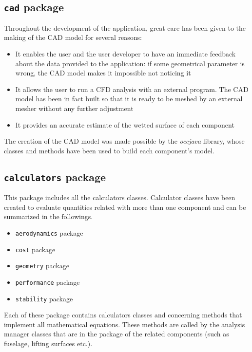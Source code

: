 \subsection{\texttt{cad} package}
Throughout the development of the application, great care has been given to the making of the CAD model for several reasons:
%
\begin{itemize}
	\item It enables the user and the user developer to have an immediate feedback about the data provided to the application: if some geometrical parameter is wrong, the CAD model makes it impossible not noticing it
	\item It allows the user to run a CFD analysis with an external program. The CAD model has been in fact built so that it is ready to be meshed by an external mesher without any further adjustment
	\item It provides an accurate estimate of the wetted surface of each component
\end{itemize}
%
The creation of the CAD model was made possible by the \emph{occjava} library, whose classes and methods have been used to build each component's model.
%
\subsection{\texttt{calculators} package}
This package includes all the calculators classes. Calculator classes have been created to evaluate quantities related with more than one component and can be summarized in the followings.
%
 \begin{itemize}
\item \lstinline[language=Java]!aerodynamics! package
\item \lstinline[language=Java]!cost! package
\item \lstinline[language=Java]!geometry! package
\item \lstinline[language=Java]!performance! package
\item \lstinline[language=Java]!stability! package
\end{itemize} 
%
Each of these package contains calculators classes and concerning methods that implement all mathematical equations. These methods are called by the analysis manager classes that are in the package of the related components (such as fuselage, lifting surfaces etc.).
%
